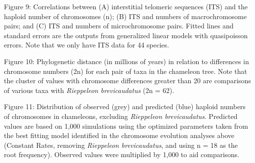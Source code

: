 \documentclass[a4paper, 12pt]{article}
\begin{document}
Figure 9: Correlations between (A) interstitial telomeric sequences (ITS) and the haploid number of chromosomes (n); (B) ITS and numbers of macrochromosome pairs; and (C) ITS and numbers of microchromosome pairs. Fitted lines and standard errors are the outputs from generalized linear models with quasipoisson errors. Note that we only have ITS data for 44 species. 

Figure 10: Phylogenetic distance (in millions of years) in relation to differences in chromosome numbers (2n) for each pair of taxa in the chameleon tree. Note that the cluster of values with chromosome differences greater than 20 are comparisons of various taxa with \textit{Rieppeleon brevicaudatus} (2n = 62).

Figure 11: Distribution of observed (grey) and predicted (blue) haploid numbers of chromosomes in chameleons, excluding \textit{Rieppeleon brevicaudatus}. Predicted values are based on 1,000 simulations using the optimized parameters taken from the best fitting model identified in the chromosome evolution analyses above (Constant Rates, removing \textit{Rieppeleon brevicaudatus}, and using n = 18 as the root frequency). Observed values were multiplied by 1,000 to aid comparisons.
\end{document}
